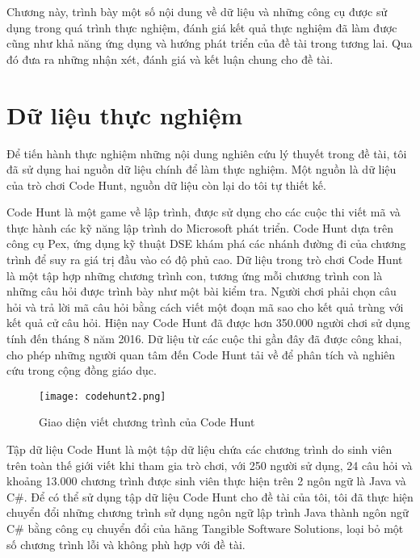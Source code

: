 
Chương này, trình bày một số nội dung về dữ liệu và những công cụ được sử dụng trong quá trình thực nghiệm, đánh giá kết quả thực nghiệm đã làm được cũng như khả năng ứng dụng và hướng phát triển của đề tài trong tương lai. Qua đó đưa ra những nhận xét, đánh giá và kết luận chung cho đề tài.

\section{Dữ liệu thực nghiệm}

Để tiến hành thực nghiệm những nội dung nghiên cứu lý thuyết trong đề
tài, tôi đã sử dụng hai nguồn dữ liệu chính để làm thực nghiệm. Một
nguồn là dữ liệu của trò chơi Code Hunt, nguồn dữ liệu còn lại do tôi
tự thiết kế.

Code Hunt \cite{CodeHunt} là một game về lập trình, được sử dụng cho
các cuộc thi viết mã và thực hành các kỹ năng lập trình do Microsoft
phát triển. Code Hunt dựa trên công cụ Pex, ứng dụng kỹ thuật DSE khám
phá các nhánh đường đi của chương trình để suy ra giá trị đầu vào có
độ phủ cao. Dữ liệu trong trò chơi Code Hunt là một tập hợp những
chương trình con, tương ứng mỗi chương trình con là những câu hỏi được
trình bày như một bài kiểm tra. Người chơi phải chọn câu hỏi và trả
lời mã câu hỏi bằng cách viết một đoạn mã sao cho kết quả trùng với
kết quả cử câu hỏi. Hiện nay Code Hunt đã được hơn 350.000 người chơi
sử dụng tính đến tháng 8 năm 2016. Dữ liệu từ các cuộc thi gần đây đã
được công khai, cho phép những người quan tâm đến Code Hunt tải về để
phân tích và nghiên cứu trong cộng đồng giáo dục.

\label{sec:data}
\begin{center}
  \begin{figure}[H]
    \begin{center}
      \texttt{[image: codehunt2.png]}
    \end{center}
    \caption{Giao diện viết chương trình của Code Hunt}
    \label{codehunt2}
  \end{figure}
\end{center}

Tập dữ liệu Code Hunt là một tập dữ liệu chứa các chương trình do sinh viên trên toàn thế giới viết khi tham gia trò chơi, với 250 người sử dụng, 24 câu hỏi và khoảng 13.000 chương trình được sinh viên thực hiện trên 2 ngôn ngữ là Java và C\#. Để có thể sử dụng tập dữ liệu Code Hunt cho đề tài của tôi, tôi đã thực hiện chuyển đổi những chương trình sử dụng ngôn ngữ lập trình Java thành ngôn ngữ C\# bằng công cụ chuyển đổi của hãng Tangible Software Solutions, loại bỏ một số chương trình lỗi và không phù hợp với đề tài.

